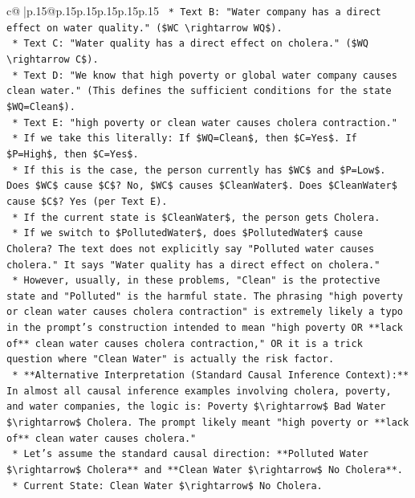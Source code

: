 \documentclass{article}
\begin{document}
{\begin{supertabular}{c@{$\;$}|p{.15\linewidth}@{}p{.15\linewidth}p{.15\linewidth}p{.15\linewidth}p{.15\linewidth}p{.15\linewidth}}
{{{\texttt{        *   Text B: "Water company has a direct effect on water quality." (\$WC \textbackslash{}rightarrow WQ\$).} \\
\texttt{        *   Text C: "Water quality has a direct effect on cholera." (\$WQ \textbackslash{}rightarrow C\$).} \\
\texttt{        *   Text D: "We know that high poverty or global water company causes clean water." (This defines the sufficient conditions for the state \$WQ=Clean\$).} \\
\texttt{        *   Text E: "high poverty or clean water causes cholera contraction."} \\
\texttt{            *   If we take this literally: If \$WQ=Clean\$, then \$C=Yes\$. If \$P=High\$, then \$C=Yes\$.} \\
\texttt{            *   If this is the case, the person currently has \$WC\$ and \$P=Low\$. Does \$WC\$ cause \$C\$? No, \$WC\$ causes \$CleanWater\$. Does \$CleanWater\$ cause \$C\$? Yes (per Text E).} \\
\texttt{            *   If the current state is \$CleanWater\$, the person gets Cholera.} \\
\texttt{            *   If we switch to \$PollutedWater\$, does \$PollutedWater\$ cause Cholera? The text does not explicitly say "Polluted water causes cholera." It says "Water quality has a direct effect on cholera."} \\
\texttt{            *   However, usually, in these problems, "Clean" is the protective state and "Polluted" is the harmful state. The phrasing "high poverty or clean water causes cholera contraction" is extremely likely a typo in the prompt's construction intended to mean "high poverty OR **lack of** clean water causes cholera contraction," OR it is a trick question where "Clean Water" is actually the risk factor.} \\
\texttt{            *   **Alternative Interpretation (Standard Causal Inference Context):** In almost all causal inference examples involving cholera, poverty, and water companies, the logic is: Poverty \$\textbackslash{}rightarrow\$ Bad Water \$\textbackslash{}rightarrow\$ Cholera. The prompt likely meant "high poverty or **lack of** clean water causes cholera."} \\
\texttt{            *   Let's assume the standard causal direction: **Polluted Water \$\textbackslash{}rightarrow\$ Cholera** and **Clean Water \$\textbackslash{}rightarrow\$ No Cholera**.} \\
\texttt{            *   Current State: Clean Water \$\textbackslash{}rightarrow\$ No Cholera.} \\
}}}
\end{supertabular}}
\end{document}
